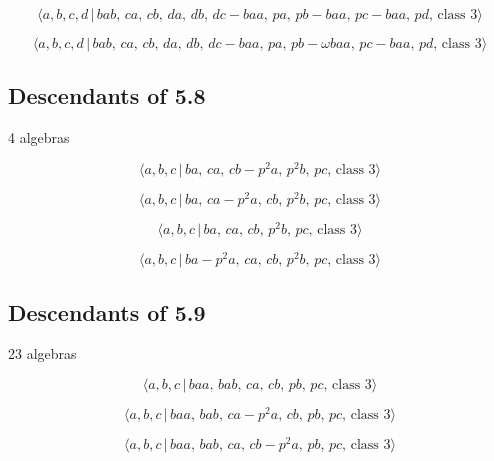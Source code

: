 \documentclass[10pt]{article}
\begin{document}
\begin{equation}
\langle
a,b,c,d\,|\,bab,\,ca,\,cb,\,da,\,db,\,dc-baa,\,pa,\,pb-baa,\,pc-baa,\,pd,\,%
\text{class }3\rangle  \tag{6.83}
\end{equation}

\begin{equation}
\langle a,b,c,d\,|\,bab,\,ca,\,cb,\,da,\,db,\,dc-baa,\,pa,\,pb-\omega
baa,\,pc-baa,\,pd,\,\text{class }3\rangle  \tag{6.84}
\end{equation}

\subsection{Descendants of 5.8}

4 algebras

\begin{equation}
\langle a,b,c\,|\,ba,\,ca,\,cb-p^2a,\,p^2b,\,pc,\,\text{class }3\rangle 
\tag{6.180}
\end{equation}

\begin{equation}
\langle a,b,c\,|\,ba,\,ca-p^2a,\,cb,\,p^2b,\,pc,\,\text{class }3\rangle 
\tag{6.181}
\end{equation}

\begin{equation}
\langle a,b,c\,|\,ba,\,ca,\,cb,\,p^2b,\,pc,\,\text{class }3\rangle 
\tag{6.182}
\end{equation}

\begin{equation}
\langle a,b,c\,|\,ba-p^2a,\,ca,\,cb,\,p^2b,\,pc,\,\text{class }3\rangle 
\tag{6.183}
\end{equation}

\subsection{Descendants of 5.9}

23 algebras

\begin{equation}
\langle a,b,c\,|\,baa,\,bab,\,ca,\,cb,\,pb,\,pc,\,\text{class }3\rangle 
\tag{6.184}
\end{equation}

\begin{equation}
\langle a,b,c\,|\,baa,\,bab,\,ca-p^2a,\,cb,\,pb,\,pc,\,\text{class }3\rangle
\tag{6.185}
\end{equation}

\begin{equation}
\langle a,b,c\,|\,baa,\,bab,\,ca,\,cb-p^2a,\,pb,\,pc,\,\text{class }3\rangle
\tag{6.186}
\end{equation}
\end{document}
